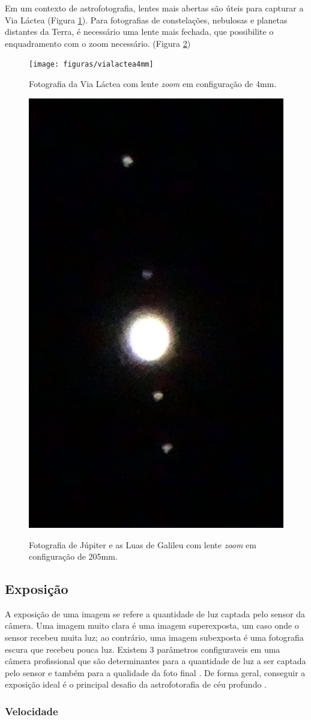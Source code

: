Em um contexto de astrofotografia, lentes mais abertas são úteis para capturar a Via Láctea (Figura \ref{fig:vialactea4mmSony}). Para fotografias de constelações, nebulosas e planetas distantes da Terra, é necessário uma lente mais fechada, que possibilite o enquadramento com o zoom necessário. (Figura \ref{fig:jupiterSony})

\begin{figure}[!htb]
	\centering
	\caption{Fotografia da Via Láctea com lente \textit{zoom} em configuração de 4mm.}
	\texttt{[image: figuras/vialactea4mm]}
	\label{fig:vialactea4mmSony}
\end{figure}

\begin{figure}[!htb]
	\centering
	\caption{Fotografia de Júpiter e as Luas de Galileu com lente \textit{zoom} em configuração de 205mm.}
	\includegraphics[width=0.2\linewidth]{figuras/jupiter205mm_Luas}
	\label{fig:jupiterSony}
\end{figure}

\subsection{Exposição}

A exposição de uma imagem se refere a quantidade de luz captada pelo sensor da câmera. Uma imagem muito clara é uma imagem superexposta, um caso onde o sensor recebeu muita luz; ao contrário, uma imagem subexposta é uma fotografia escura que recebeu pouca luz. Existem 3 parâmetros configuraveis em uma câmera profissional que são determinantes para a quantidade de luz a ser captada pelo sensor e também para a qualidade da foto final \cite{site:eduardoemonica}. De forma geral, conseguir a exposição ideal é o principal desafio da astrofotorafia de céu profundo \cite{livro:astropratica}.


\subsubsection{Velocidade}

